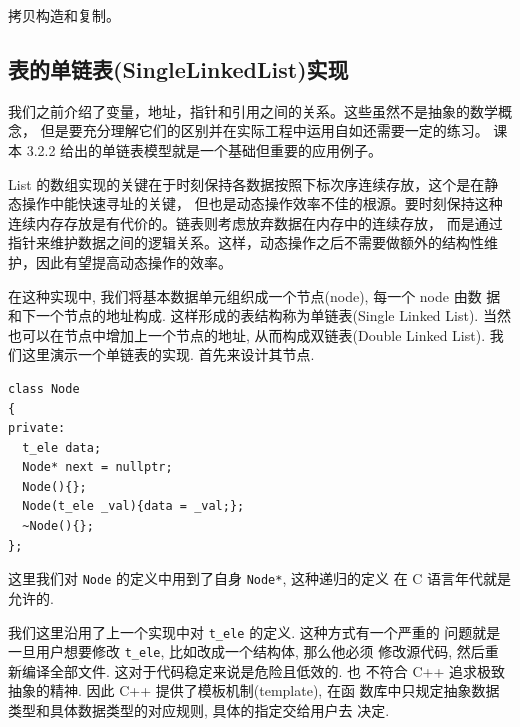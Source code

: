 \documentclass[a4paper]{ctexart}
\theoremstyle{definition}
\theoremstyle{definition}
\begin{document}
拷贝构造和复制。


\subsection{表的单链表(SingleLinkedList)实现}
我们之前介绍了变量，地址，指针和引用之间的关系。这些虽然不是抽象的数学概念，
但是要充分理解它们的区别并在实际工程中运用自如还需要一定的练习。
课本 3.2.2 给出的单链表模型就是一个基础但重要的应用例子。

List 的数组实现的关键在于时刻保持各数据按照下标次序连续存放，这个是在静态操作中能快速寻址的关键，
但也是动态操作效率不佳的根源。要时刻保持这种连续内存存放是有代价的。链表则考虑放弃数据在内存中的连续存放，
而是通过指针来维护数据之间的逻辑关系。这样，动态操作之后不需要做额外的结构性维护，因此有望提高动态操作的效率。

在这种实现中, 我们将基本数据单元组织成一个节点(node), 每一个 node 由数
据和下一个节点的地址构成. 这样形成的表结构称为单链表(Single Linked
List). 当然也可以在节点中增加上一个节点的地址, 从而构成双链表(Double
Linked List). 我们这里演示一个单链表的实现. 首先来设计其节点.

\begin{verbatim}
class Node
{
private:
  t_ele data;
  Node* next = nullptr; 
  Node(){};
  Node(t_ele _val){data = _val;};
  ~Node(){};
};
\end{verbatim}
这里我们对 \verb|Node| 的定义中用到了自身 \verb|Node*|, 这种递归的定义
在 C 语言年代就是允许的.

我们这里沿用了上一个实现中对 \verb|t_ele| 的定义. 这种方式有一个严重的
问题就是一旦用户想要修改 \verb|t_ele|, 比如改成一个结构体, 那么他必须
修改源代码, 然后重新编译全部文件. 这对于代码稳定来说是危险且低效的. 也
不符合 C++ 追求极致抽象的精神. 因此 C++ 提供了模板机制(template), 在函
数库中只规定抽象数据类型和具体数据类型的对应规则, 具体的指定交给用户去
决定. 
\end{document}
